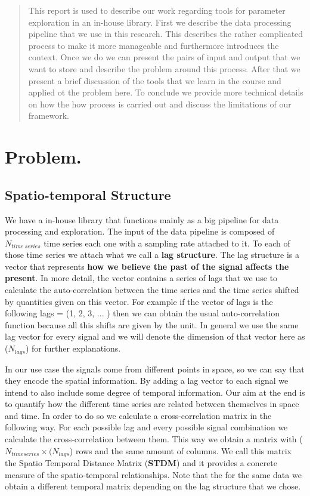\documentclass[11pt,a4paper]{article}
\begin{document}
\begin{abstract}
This report is used to describe our work regarding tools for parameter
exploration in an in-house library. First we describe the data
processing pipeline that we use in this research. This describes the rather complicated process to make it more manageable and furthermore introduces the context. Once we do we can present the pairs of input and output that we want to store and describe the problem around this process. After that we present a brief discussion of the tools that we learn in the course and applied ot the problem here. To conclude we provide more technical details on how the how process is carried out and discuss the limitations of our framework.
\end{abstract}


\section{Problem.}\label{problem.}

\subsection{Spatio-temporal Structure}\label{spatio-temporal-structure}

We have a in-house library that functions mainly as a big pipeline for
data processing and exploration. The input of the data pipeline is composed of $N_{time\:series}$ time series each one with a sampling rate attached to it. To each of those time series we attach what we call a \textbf{lag structure}. The lag structure is a vector that
represents \textbf{how we believe the past of the signal affects the
present}. In more detail, the vector contains a series of lags that we
use to calculate the auto-correlation between the time series and the
time series shifted by quantities given on this vector. For example if the vector of lags is
the following lags = (1, 2, 3, ... ) then we can obtain the usual
auto-correlation function because all this shifts are given by the unit. In general we use the same lag vector for every signal and we will denote the dimension of that vector here as
($N_{lags}$) for further explanations.

In our use case the signals come from different points in space, so we can say that they
encode the spatial information. By adding a lag vector to each signal we
intend to also include some degree of temporal information. Our aim at the end is to
quantify how the different time series are related between
themselves in space and time. In order to do so we calculate a
cross-correlation matrix in the following way. For each possible lag and every possible
signal combination we calculate the cross-correlation between them. This
way we obtain a matrix with ($N_{time series} \times (N_{lags}$)
rows and the same amount of columns. We call this matrix the Spatio
Temporal Distance Matrix (\textbf{STDM}) and it provides a concrete
measure of the spatio-temporal relationships. Note that the for the same data we obtain a different temporal matrix depending on the lag structure that we chose.
\end{document}
